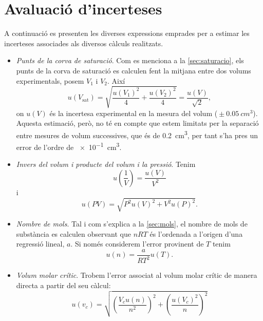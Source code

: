 \documentclass[12pt]{article}
\numberwithin{table}{section}
\numberwithin{figure}{section}
\numberwithin{equation}{section}
\newcommand{\unc}[2]{\ensuremath{{}\pm \SI{#1}{#2}}}
\begin{document}
\section{Avaluació d'incerteses}
A continuació es presenten les diverses expressions emprades per a estimar les incerteses associades als diversos càlculs realitzats. 
\begin{itemize}
	\item \emph{Punts de la corva de saturació}. Com es menciona a la \cref{sec:saturacio}, els punts de la corva de saturació es calculen fent la mitjana entre dos volums experimentals, posem \( V_1 \) i \( V_2 \). Així
		\begin{equation*}
			u(V_\text{sat}) = \sqrt{\frac{u(V_1)^2}{4} + \frac{u(V_2)^2}{4}} = \frac{u(V)}{\sqrt{2}},
		\end{equation*}
		on \( u(V) \) és la incertesa experimental en la mesura del volum (\unc{0.05}{cm^3}). Aquesta estimació, però, no té en compte que estem limitats per la separació entre mesures de volum successives, que és de \SI{0.2}{cm^3}, per tant s'ha pres un error de l'ordre de \SI{e-1}{cm^3}.
	\item \emph{Invers del volum i producte del volum i la pressió}. Tenim
		\begin{equation*}
			u\left(\frac{1}{V}\right) = \frac{u(V)}{V^2}
		\end{equation*}
		i
		\begin{equation*}
			u(PV) = \sqrt{P^2 u(V)^2 + V^2 u(P)^2}.
		\end{equation*}

	\item \emph{Nombre de mols}. Tal i com s'explica a la \cref{sec:mols}, el nombre de mols de substància es calculen observant que \( nRT \) és l'ordenada a l'origen d'una regressió lineal, \( a \). Si només considerem l'error provinent de \( T \) tenim
		\begin{equation*}
			u(n) = \frac{a}{RT^2}u(T).
		\end{equation*}
	\item \emph{Volum molar crític}. Trobem l'error associat al volum molar crític de manera directa a partir del seu càlcul:
		\begin{equation*}
			u(v_c) = \sqrt{\left(\frac{V_c u(n)}{n^2}\right)^2 + \left(\frac{u(V_c)^2}{n}\right)^2}
		\end{equation*}
		

\end{itemize}
\end{document}
